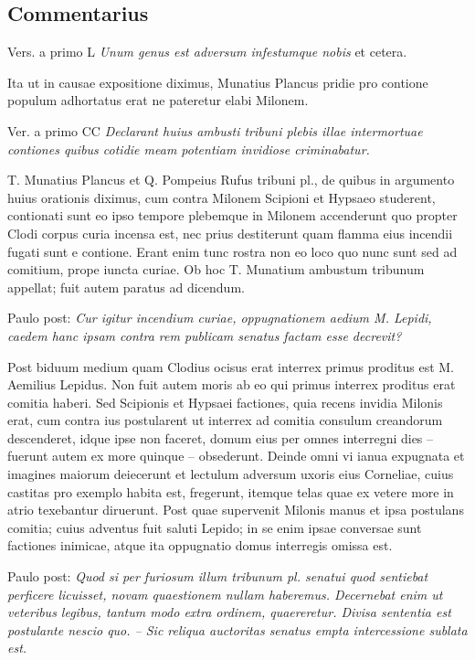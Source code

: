 \subsection*{Commentarius}

Vers. a primo L \textit{Unum genus est adversum infestumque nobis} et cetera.

Ita ut in causae expositione diximus, Munatius Plancus pridie pro contione populum adhortatus erat ne pateretur elabi Milonem.

Ver. a primo CC \textit{Declarant huius ambusti tribuni plebis illae intermortuae contiones quibus cotidie meam potentiam invidiose criminabatur.}

T. Munatius Plancus et Q. Pompeius Rufus tribuni pl., de quibus in argumento huius orationis diximus, cum contra Milonem Scipioni et Hypsaeo studerent, contionati sunt eo ipso tempore plebemque in Milonem accenderunt quo propter Clodi corpus curia incensa est, nec prius destiterunt quam flamma eius incendii fugati sunt e contione. Erant enim tunc rostra non eo loco quo nunc sunt sed ad comitium, prope iuncta curiae. Ob hoc T. Munatium ambustum tribunum appellat; fuit autem paratus ad dicendum.

Paulo post: \textit{Cur igitur incendium curiae, oppugnationem aedium M. Lepidi, caedem hanc ipsam contra rem publicam senatus factam esse decrevit?}

Post biduum medium quam Clodius ocisus erat interrex primus proditus est M. Aemilius Lepidus. Non fuit autem moris ab eo qui primus interrex proditus erat comitia haberi. Sed Scipionis et Hypsaei factiones, quia recens invidia Milonis erat, cum contra ius postularent ut interrex ad comitia consulum creandorum descenderet, idque ipse non faceret, domum eius per omnes interregni dies – fuerunt autem ex more quinque – obsederunt. Deinde omni vi ianua expugnata et imagines maiorum deiecerunt et lectulum adversum uxoris eius Corneliae, cuius castitas pro exemplo habita est, fregerunt, itemque telas quae ex vetere more in atrio texebantur diruerunt. Post quae supervenit Milonis manus et ipsa postulans comitia; cuius adventus fuit saluti Lepido; in se enim ipsae conversae sunt factiones inimicae, atque ita oppugnatio domus interregis omissa est.

Paulo post: \textit{Quod si per furiosum illum tribunum pl. senatui quod sentiebat perficere licuisset, novam quaestionem nullam haberemus. Decernebat enim ut veteribus legibus, tantum modo extra ordinem, quaereretur. Divisa sententia est postulante nescio quo. – Sic reliqua auctoritas senatus empta intercessione sublata est.}

